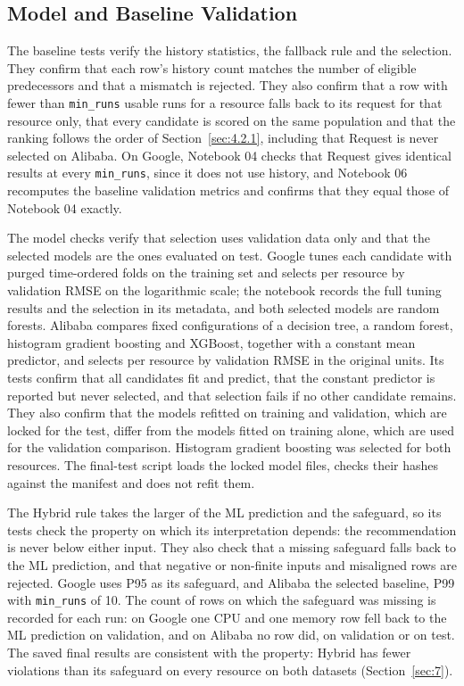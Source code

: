 \subsection{Model and Baseline Validation}\label{sec:6.3}

The baseline tests verify the history statistics, the fallback rule and the selection. They confirm that each row's history count matches the number of eligible predecessors and that a mismatch is rejected. They also confirm that a row with fewer than \texttt{min\_runs} usable runs for a resource falls back to its request for that resource only, that every candidate is scored on the same population and that the ranking follows the order of Section~\ref{sec:4.2.1}, including that Request is never selected on Alibaba. On Google, Notebook 04 checks that Request gives identical results at every \texttt{min\_runs}, since it does not use history, and Notebook 06 recomputes the baseline validation metrics and confirms that they equal those of Notebook 04 exactly.

The model checks verify that selection uses validation data only and that the selected models are the ones evaluated on test. Google tunes each candidate with purged time-ordered folds on the training set and selects per resource by validation RMSE on the logarithmic scale; the notebook records the full tuning results and the selection in its metadata, and both selected models are random forests. Alibaba compares fixed configurations of a decision tree, a random forest, histogram gradient boosting and XGBoost, together with a constant mean predictor, and selects per resource by validation RMSE in the original units. Its tests confirm that all candidates fit and predict, that the constant predictor is reported but never selected, and that selection fails if no other candidate remains. They also confirm that the models refitted on training and validation, which are locked for the test, differ from the models fitted on training alone, which are used for the validation comparison. Histogram gradient boosting was selected for both resources. The final-test script loads the locked model files, checks their hashes against the manifest and does not refit them.

The Hybrid rule takes the larger of the ML prediction and the safeguard, so its tests check the property on which its interpretation depends: the recommendation is never below either input. They also check that a missing safeguard falls back to the ML prediction, and that negative or non-finite inputs and misaligned rows are rejected. Google uses P95 as its safeguard, and Alibaba the selected baseline, P99 with \texttt{min\_runs} of 10. The count of rows on which the safeguard was missing is recorded for each run: on Google one CPU and one memory row fell back to the ML prediction on validation, and on Alibaba no row did, on validation or on test. The saved final results are consistent with the property: Hybrid has fewer violations than its safeguard on every resource on both datasets (Section~\ref{sec:7}).

